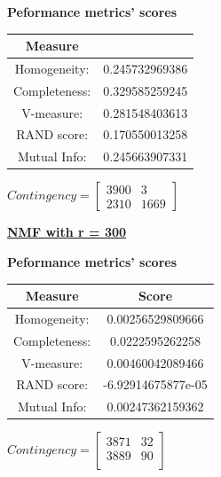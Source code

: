 \documentclass{report}
\begin{document}
\begin{center}
	\textbf{Peformance metrics' scores} \\ \vspace{10pt}
	\begin{tabular}{*{2}{c}}
		\toprule
		\textbf{Measure} & \texbf{Score} \\
		\midrule 		
		Homogeneity: & 0.245732969386 \\
		\midrule
		Completeness: & 0.329585259245 \\
		\midrule
		V-measure: 	& 0.281548403613 \\
		\midrule
		RAND score: & 0.170550013258 \\
		\midrule
		Mutual Info: & 0.245663907331 \\
		\bottomrule
	\end{tabular}
	\qquad
	$Contingency = \left[\begin{array}{*{2}{c}}
		3900  & 3 \\
		2310  & 1669 
			\end{array} \right]
		$
\end{center}
\newpage

\underline{\textbf{NMF with r = 300}} 

\begin{center}
	\textbf{Peformance metrics' scores} \\ \vspace{10pt}
	\begin{tabular}{*{2}{c}}
		\toprule
		\textbf{Measure} & \textbf{Score} \\
		\midrule
		Homogeneity: 		& 0.00256529809666 \\ 
		\midrule
		Completeness: 		& 0.0222595262258 \\
		\midrule
		V-measure: 			& 0.00460042089466 \\
		\midrule
		RAND score: 		& -6.92914675877e-05 \\
		\midrule
		Mutual Info: 		& 0.00247362159362 \\
		\bottomrule
	\end{tabular}
	\qquad	
	$Contingency = \left[\begin{array}{*{2}{c}} 
		3871   	& 32 \\
		3889   	& 90 \\ 
			\end{array}\right]
		$
\end{center}

\\ \vspace{20pt}
\end{document}
